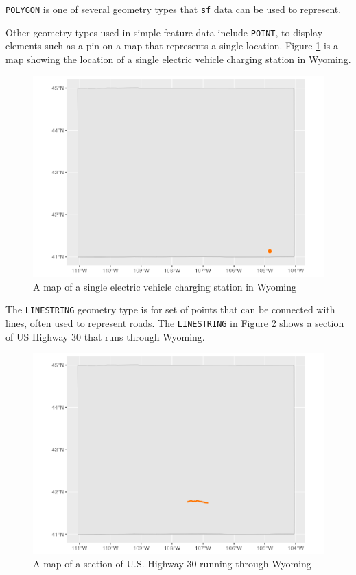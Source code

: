 \documentclass[
]{book}
\begin{document}
\texttt{POLYGON} is one of several geometry types that \texttt{sf} data can be used to represent.

Other geometry types used in simple feature data include \texttt{POINT}, to display elements such as a pin on a map that represents a single location. Figure \ref{fig:ev-stations-map} is a map showing the location of a single electric vehicle charging station in Wyoming.

\begin{figure}
\includegraphics[width=1\linewidth]{maps_files/figure-latex/ev-stations-map-1} \caption{A map of a single electric vehicle charging station in Wyoming}\label{fig:ev-stations-map}
\end{figure}

The \texttt{LINESTRING} geometry type is for set of points that can be connected with lines, often used to represent roads. The \texttt{LINESTRING} in Figure \ref{fig:wy-roads-map} shows a section of US Highway 30 that runs through Wyoming.

\begin{figure}
\includegraphics[width=1\linewidth]{maps_files/figure-latex/wy-roads-map-1} \caption{A map of a section of U.S. Highway 30 running through Wyoming}\label{fig:wy-roads-map}
\end{figure}
\end{document}
